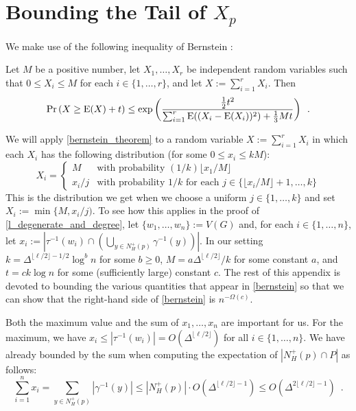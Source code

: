\documentclass{patmorin}
\begin{document}
\appendix

\section{Bounding the Tail of \boldmath $X_p$}

We make use of the following inequality of Bernstein \cite[Corollary~2.11]{boucheron.lugosi.ea:concentration}:

\begin{thm}\label{bernstein_theorem}
  Let $M$ be a positive number, let $X_1,\ldots,X_r$ be independent random variables such that $0\le X_i\le M$ for each $i\in\{1,\ldots,r\}$, and let $X:=\sum_{i=1}^r X_i$. Then
  \begin{equation}
    \Pr\left(X \ge \mathrm{E}(X)+ t\right)
      \le \exp\left(\frac{\tfrac{1}{2}t^2}{\sum_{i=1}^r \mathrm{E}((X_i-\mathrm{E}(X_i))^2)+\tfrac{1}{3}Mt}\right) \enspace . \label{bernstein}
  \end{equation}
\end{thm}
We will apply \cref{bernstein_theorem} to a random variable $X:=\sum_{i=1}^r X_i$ in which each $X_i$ has the following distribution (for some $0\le x_i\le kM$):
\[
  X_i = \begin{cases}
          M & \text{with probability $(1/k)\lfloor x_1/M\rfloor$} \\
          x_i/j & \text{with probability $1/k$ for each $j\in\{\lfloor x_i/M\rfloor+1,\ldots,k\}$}
        \end{cases}
\]
This is the distribution we get when we choose a uniform $j\in\{1,\ldots,k\}$ and set $X_i:=\min\{M,x_i/j)$.  To see how this applies in the proof of \cref{l_degenerate_and_degree}, let $\{w_1,\ldots,w_n\}:=V(G)$ and, for each $i\in\{1,\ldots,n\}$, let $x_i:=|\tau^{-1}(w_i)\cap\left(\bigcup_{y\in N^+_H(p)}\gamma^{-1}(y)\right)|$.  In our setting $k=\Delta^{\lfloor\ell/2\rfloor-1/2}\log^b n$ for some $b\ge 0$,  $M=a\Delta^{\lfloor\ell/2\rfloor}/k$ for some constant $a$, and $t=ck\log n$ for some (sufficiently large) constant $c$.  The rest of this appendix is devoted to bounding the various quantities that appear in \cref{bernstein} so that we can show that the right-hand side of \cref{bernstein} is $n^{-\Omega(c)}$.

Both the maximum value and the sum of $x_1,\ldots,x_n$ are important for us. For the maximum, we have $x_i\le|\tau^{-1}(w_i)|= O(\Delta^{\lfloor\ell/2\rfloor})$ for all $i\in\{1,\ldots,n\}$.  We have already bounded by the sum when computing the expectation of $|N_H^+(p)\cap P|$ as follows:
\[
  \sum_{i=1}^n x_i = \sum_{y\in N^+_H(p)} |\gamma^{-1}(y)|
  \le |N^+_H(p)|\cdot O(\Delta^{\lfloor\ell/2\rfloor-1})
  \le O(\Delta^{2\lfloor\ell/2\rfloor-1}) \enspace .
\]
\end{document}
